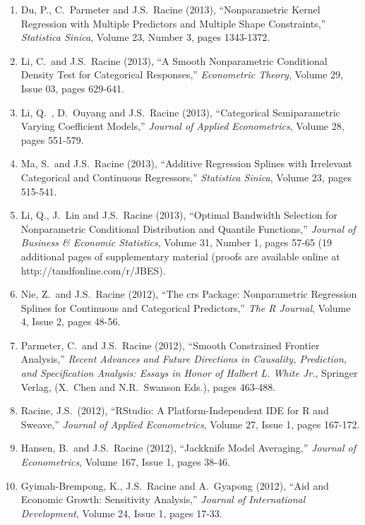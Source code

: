 \documentclass[
]{article}
\begin{document}
\begin{enumerate}
  (A.~Ullah, J.S.~Racine and L.~Su Eds.), Oxford University Press, New
  York, pages 308-345.
\item
  Du, P., C.~Parmeter and J.S.~Racine (2013), ``Nonparametric Kernel
  Regression with Multiple Predictors and Multiple Shape Constraints,''
  \emph{Statistica Sinica}, Volume 23, Number 3, pages 1343-1372.
\item
  Li, C.~and J.S.~Racine (2013), ``A Smooth Nonparametric Conditional
  Density Test for Categorical Responses,'' \emph{Econometric Theory},
  Volume 29, Issue 03, pages 629-641.
\item
  Li, Q.~, D.~Ouyang and J.S.~Racine (2013), ``Categorical
  Semiparametric Varying Coefficient Models,'' \emph{Journal of Applied
  Econometrics}, Volume 28, pages 551-579.
\item
  Ma, S.~and J.S.~Racine (2013), ``Additive Regression Splines with
  Irrelevant Categorical and Continuous Regressors,'' \emph{Statistica
  Sinica}, Volume 23, pages 515-541.
\item
  Li, Q., J.~Lin and J.S.~Racine (2013), ``Optimal Bandwidth Selection
  for Nonparametric Conditional Distribution and Quantile Functions,''
  \emph{Journal of Business \& Economic Statistics}, Volume 31, Number
  1, pages 57-65 (19 additional pages of supplementary material (proofs
  are available online at http://tandfonline.com/r/JBES).
\item
  Nie, Z.~and J.S.~Racine (2012), ``The crs Package: Nonparametric
  Regression Splines for Continuous and Categorical Predictors,''
  \emph{The R Journal}, Volume 4, Issue 2, pages 48-56.
\item
  Parmeter, C.~and J.S.~Racine (2012), ``Smooth Constrained Frontier
  Analysis,'' \emph{Recent Advances and Future Directions in Causality,
  Prediction, and Specification Analysis: Essays in Honor of Halbert L.
  White Jr.}, Springer Verlag, (X.~Chen and N.R.~Swanson Eds.), pages
  463-488.
\item
  Racine, J.S.~(2012), ``RStudio: A Platform-Independent IDE for R and
  Sweave,'' \emph{Journal of Applied Econometrics}, Volume 27, Issue 1,
  pages 167-172.
\item
  Hansen, B.~and J.S.~Racine (2012), ``Jackknife Model Averaging,''
  \emph{Journal of Econometrics}, Volume 167, Issue 1, pages 38-46.
\item
  Gyimah-Brempong, K., J.S.~Racine and A.~Gyapong (2012), ``Aid and
  Economic Growth: Sensitivity Analysis,'' \emph{Journal of
  International Development}, Volume 24, Issue 1, pages 17-33.

\end{enumerate}
\end{document}
